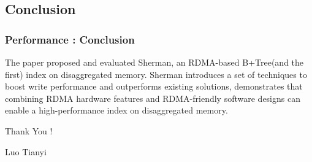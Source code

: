 \documentclass[11pt]{beamer}                                                                                                   %
\begin{document}
\subsection{Conclusion}
\begin{frame}[fragile]
	\frametitle{Performance : Conclusion}
	The paper proposed and evaluated Sherman, an RDMA-based B+Tree(and the first)
	index on disaggregated memory. Sherman introduces a set of techniques to boost write performance and outperforms existing solutions, demonstrates that combining RDMA
	hardware features and RDMA-friendly software designs can enable
	a high-performance index on disaggregated memory.
\end{frame}
\begin{frame}[plain,c]
	\begin{center}
		\Huge Thank You !
		
		\vspace{2cm}
		\small Luo Tianyi
	\end{center}
\end{frame}
\end{document}
